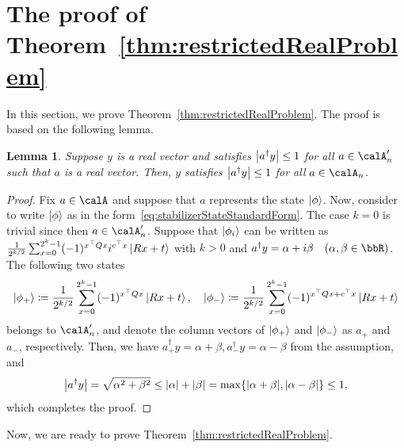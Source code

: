 \documentclass[a4paper, onecolumn, 11pt, longbibliography]{quantumarticle}
\newcommand{\defeq}{\coloneqq}
\newtheorem{lemma}{Lemma}
\begin{document}
\section{The proof of Theorem~\ref{thm:restrictedRealProblem}}

In this section, we prove Theorem~\ref{thm:restrictedRealProblem}.
The proof is based on the following lemma.
\begin{lemma}{\label{lem:absRealForTIsAbsRealForS}}
  Suppose $y$ is a real vector and satisfies
  $\abs{a^\dagger y} \leq 1$ for all $a \in \calA'_n$
  such that $a$ is a real vector.
  Then, $y$ satisfies
  $\abs{a^\dagger y} \leq 1$ for all $a \in \calA_n$.
\end{lemma}
\begin{proof}
  Fix $a \in \calA$ and suppose that $a$ represents
  the state $\ket{\phi}$.
  Now, consider to write $\ket{\phi}$ as in the form~\eqref{eq:stabilizerStateStandardForm}.
  The case $k=0$ is trivial since then $a \in \calA'_n$.
  Suppose that $\ket{\phi_i}$ can be written as
  $\frac{1}{2^{k/2}}\sum_{x=0}^{2^k-1} (-1)^{x^\top Q x} i^{c^\top x} \ket{Rx+t}$ with $k>0$
  and
  $a^\dagger y = \alpha + i\beta \quad (\alpha, \beta \in \bbR)$.
  The following two states
  \begin{equation*}
    \ket{\phi_+} \defeq \frac{1}{2^{k/2}}\sum_{x=0}^{2^k-1} (-1)^{x^\top Q x} \ket{Rx+t}, \quad
    \ket{\phi_-} \defeq \frac{1}{2^{k/2}}\sum_{x=0}^{2^k-1} (-1)^{x^\top Q x + c^\top x} \ket{Rx+t}
  \end{equation*}
  belongs to $\calA'_n$,
  and denote the column vectors of $\ket{\phi_+}$ and $\ket{\phi_-}$ as $a_+$ and $a_-$, respectively.
  Then, we have $a_+^\dagger y = \alpha+\beta, a_-^\dagger y = \alpha-\beta$
  from the assumption, and
  \begin{equation*}
    \abs{a^\dagger y}
    =\sqrt{\alpha^2 + \beta^2}
    \leq \abs{\alpha}+\abs{\beta}
    = \max\{\abs{\alpha+\beta}, \abs{\alpha-\beta}\}
    \leq 1,
  \end{equation*}
  which completes the proof.
\end{proof}

Now, we are ready to prove Theorem~\ref{thm:restrictedRealProblem}.
\end{document}
